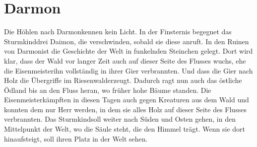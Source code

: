 \documentclass[12pt,a4paper,onecolumn,twoside,ngerman]{book}
\newcommand{\Sturmkind}{Sturmkind}
\newcommand{\Daimon}{Daimon}
\newcommand{\Darmon}{Darmon}
\newcommand{\Riesenwald}{Riesenwald}
\newcommand{\Eisenmeister}{Eisenmeister}
\begin{document}
\section{\Darmon}
Die Höhlen nach \Darmon kennen kein Licht. In der Finsternis begegnet das \Sturmkind drei \Daimon, die verschwinden, sobald sie diese anruft.
In den Ruinen von \Darmon ist die Geschichte der Welt in funkelnden Steinchen gelegt. Dort wird klar, dass der Wald vor langer Zeit auch auf dieser Seite des Flusses wuchs, ehe die \Eisenmeister ihn vollständig in ihrer Gier verbrannten. Und dass die Gier nach Holz die Übergriffe im \Riesenwald erzeugt. Dadurch ragt nun auch das östliche Ödland bis an den Fluss heran, wo früher hohe Bäume standen. Die \Eisenmeister kämpften in diesen Tagen auch gegen Kreaturen aus dem Wald und konnten dem nur Herr werden, in dem sie alles Holz auf dieser Seite des Flusses verbrannten. Das \Sturmkind soll weiter nach Süden und Osten gehen, in den Mittelpunkt der Welt, wo die Säule steht, die den Himmel trägt. Wenn sie dort hinaufsteigt, soll ihren Platz in der Welt sehen.
\end{document}
